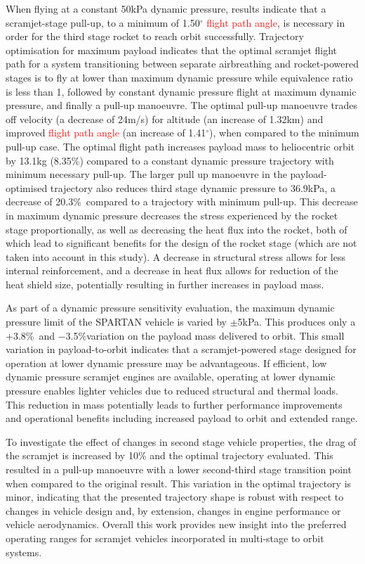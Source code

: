 \documentclass[journal]{new-aiaa}
\newcommand{\PayloadImprovement}{8.35\%}
\newcommand{\qDecrease}{20.3\%}
\newcommand{\qVariationPlus}{$+$3.8\%}
\newcommand{\qVariationMinus}{$-$3.5\%}
\newcommand{\SeparationAngleConstq}{1.50}
\newcommand{\SeparationqFiftykPa}{36.9}
\begin{document}
   When flying at a constant 50kPa dynamic pressure, results indicate that a scramjet-stage pull-up, to a minimum of \SeparationAngleConstq $^\circ$ \textcolor{red}{flight path angle}, is necessary in order for the third stage rocket to reach orbit successfully. Trajectory optimisation for maximum payload indicates that the optimal scramjet flight path for a system transitioning between separate airbreathing and rocket-powered stages is to fly at lower than maximum dynamic pressure while equivalence ratio is less than 1, followed by constant dynamic pressure flight at maximum dynamic pressure, and finally a pull-up manoeuvre. The optimal pull-up manoeuvre trades off velocity (a decrease of 24m/s) for altitude (an increase of 1.32km) and improved \textcolor{red}{flight path angle} (an increase of 1.41$^\circ$), when compared to the minimum pull-up case. The optimal flight path increases payload mass to heliocentric orbit by 13.1kg (\PayloadImprovement) compared to a constant dynamic pressure trajectory with minimum necessary pull-up. The larger pull up manoeuvre in the payload-optimised trajectory also reduces third stage dynamic pressure to \SeparationqFiftykPa kPa, a decrease of \qDecrease\ compared to a trajectory with minimum pull-up. This decrease in maximum dynamic pressure decreases the stress experienced by the rocket stage proportionally, as well as decreasing the heat flux into the rocket, both of which lead to significant benefits for the design of the rocket stage (which are not taken into account in this study). A decrease in structural stress allows for less internal reinforcement, and a decrease in heat flux allows for reduction of the heat shield size, potentially resulting in further increases in payload mass.
  

As part of a dynamic pressure sensitivity evaluation, the maximum dynamic pressure limit of the SPARTAN vehicle is varied by $\pm$5kPa. This produces only a \qVariationPlus\ and \qVariationMinus \space variation on the payload mass delivered to orbit. This small variation in payload-to-orbit indicates that a scramjet-powered stage designed for operation at lower dynamic pressure may be advantageous.
If efficient, low dynamic pressure scramjet engines are available, operating at lower dynamic pressure enables lighter vehicles due to reduced structural and thermal loads. This reduction in mass potentially leads to further performance improvements and operational benefits including increased payload to orbit and extended range.
 
 To investigate the effect of changes in second stage vehicle properties, the drag of the scramjet is increased by 10\% and the optimal trajectory evaluated. This resulted in a pull-up manoeuvre with a lower second-third stage transition point when compared to the original result. This variation in the optimal trajectory is minor, indicating that the presented trajectory shape is robust with respect to changes in vehicle design and, by extension, changes in engine performance or vehicle aerodynamics. Overall this work provides new insight into the preferred operating ranges for scramjet vehicles incorporated in multi-stage to orbit systems.
\end{document}
